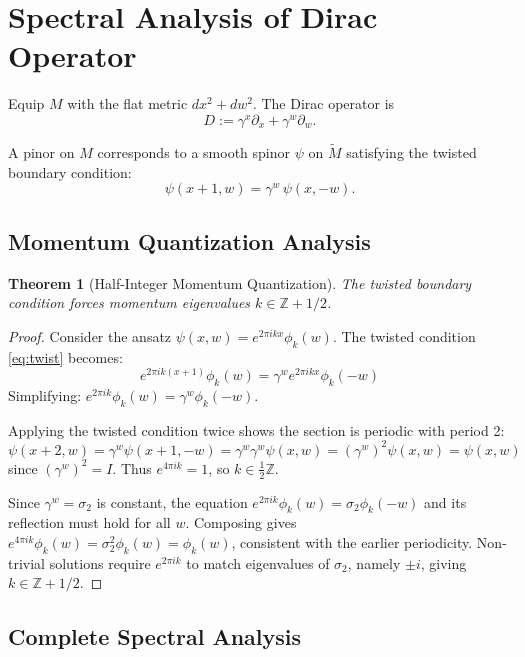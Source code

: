 \documentclass[11pt]{amsart}
\newtheorem{theorem}{Theorem}[section]
\theoremstyle{definition}
\theoremstyle{remark}
\newcommand{\ZZ}{\mathbb{Z}}
\newcommand{\wt}{\widetilde}
\begin{document}
\section{Spectral Analysis of Dirac Operator}\label{sec:Dirac}

Equip $M$ with the flat metric $dx^2+dw^2$. The Dirac operator is
\[
D:=\gamma^x\partial_x+\gamma^w\partial_w.
\]

A pinor on $M$ corresponds to a smooth spinor $\psi$ on $\wt{M}$ satisfying the twisted boundary condition:
\begin{equation}\label{eq:twist}
\psi(x+1,w)=\gamma^w\,\psi(x,-w).
\end{equation}

\subsection{Momentum Quantization Analysis}

\begin{theorem}[Half-Integer Momentum Quantization]\label{thm:half-integer}
The twisted boundary condition forces momentum eigenvalues $k \in \ZZ + 1/2$.
\end{theorem}

\begin{proof}
Consider the ansatz $\psi(x,w) = e^{2\pi i k x}\phi_k(w)$. The twisted condition \eqref{eq:twist} becomes:
\[
e^{2\pi i k(x+1)}\phi_k(w) = \gamma^w e^{2\pi i k x}\phi_k(-w)
\]
Simplifying: $e^{2\pi i k}\phi_k(w) = \gamma^w \phi_k(-w)$.

Applying the twisted condition twice shows the section is periodic with period 2:
\[
\psi(x+2,w) = \gamma^w\psi(x+1,-w) = \gamma^w\gamma^w\psi(x,w) = (\gamma^w)^2\psi(x,w) = \psi(x,w)
\]
since $(\gamma^w)^2 = I$. Thus $e^{4\pi i k} = 1$, so $k \in \frac{1}{2}\ZZ$.

Since $\gamma^w = \sigma_2$ is constant, the equation $e^{2\pi i k}\phi_k(w) = \sigma_2 \phi_k(-w)$ and its reflection must hold for all $w$. Composing gives $e^{4\pi i k}\phi_k(w) = \sigma_2^2 \phi_k(w) = \phi_k(w)$, consistent with the earlier periodicity. Non-trivial solutions require $e^{2\pi i k}$ to match eigenvalues of $\sigma_2$, namely $\pm i$, giving $k \in \ZZ + 1/2$.
\end{proof}

\subsection{Complete Spectral Analysis}
\end{document}

